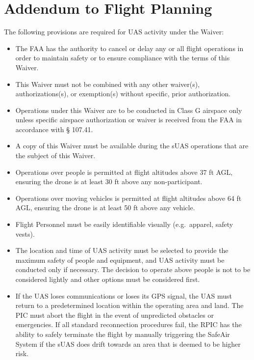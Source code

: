 \documentclass[
]{book}
\providecommand{\tightlist}{%
  \setlength{\itemsep}{0pt}\setlength{\parskip}{0pt}}
\begin{document}
\section{Addendum to Flight Planning}\label{s39u88-fp}

The following provisions are required for UAS activity under the Waiver:

\begin{itemize}
\tightlist
\item
  The FAA has the authority to cancel or delay any or all flight operations in order to maintain safety or to ensure compliance with the terms of this Waiver.
\item
  This Waiver must not be combined with any other waiver(s), authorizations(s), or exemption(s) without specific, prior authorization.
\item
  Operations under this Waiver are to be conducted in Class G airspace only unless specific airspace authorization or waiver is received from the FAA in accordance with § 107.41.
\item
  A copy of this Waiver must be available during the sUAS operations that are the subject of this Waiver.
\item
  Operations over people is permitted at flight altitudes above 37 ft AGL, ensuring the drone is at least 30 ft above any non-participant.
\item
  Operations over moving vehicles is permitted at flight altitudes above 64 ft AGL, ensuring the drone is at least 50 ft above any vehicle.
\item
  Flight Personnel must be easily identifiable visually (e.g.~apparel, safety vests).
\item
  The location and time of UAS activity must be selected to provide the maximum safety of people and equipment, and UAS activity must be conducted only if necessary. The decision to operate above people is not to be considered lightly and other options must be considered first.
\item
  If the UAS loses communications or loses its GPS signal, the UAS must return to a predetermined location within the operating area and land. The PIC must abort the flight in the event of unpredicted obstacles or emergencies. If all standard reconnection procedures fail, the RPIC has the ability to safely terminate the flight by manually triggering the SafeAir System if the sUAS does drift towards an area that is deemed to be higher risk.
\end{itemize}
\end{document}

